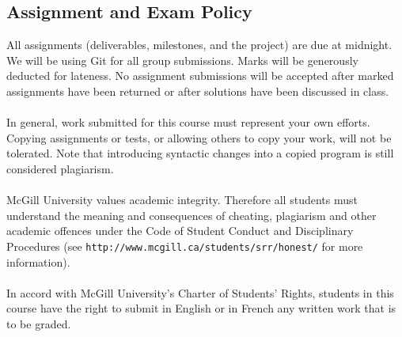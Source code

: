 \documentclass{article}
\begin{document}
\subsection*{Assignment and Exam Policy}
All assignments (deliverables, milestones, and the project) are due at midnight.
We will be using Git for all group submissions. Marks will be generously
deducted for lateness. No assignment submissions will be accepted after marked
assignments have been returned or after solutions have been discussed in class. \\ \\
In general, work submitted for this course must represent your own efforts.
Copying assignments or tests, or allowing others to copy your work, will not
be tolerated. Note that introducing syntactic changes into a copied program
is still considered plagiarism. \\ \\
McGill University values academic integrity. Therefore all students must
understand the meaning and consequences of cheating, plagiarism and other
academic offences under the Code of Student Conduct and Disciplinary
Procedures (see {\tt http://www.mcgill.ca/students/srr/honest/} for more information). \\ \\
In accord with McGill University's Charter of Students' Rights, students in
this course have the right to submit in English or in French any written work
that is to be graded.
\end{document}
